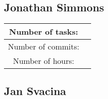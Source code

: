 \documentclass{article}
\begin{document}
    \subsection*{Jonathan Simmons}

    \begin{center}
        \begin{tabular}{||c c ||}
            \hline
            Number of tasks: &  \\
            \hline
            Number of commits: &  \\
            \hline
            Number of hours: &  \\
            \hline
        \end{tabular}
    \end{center}

    \subsection*{Jan Svacina}
\end{document}
